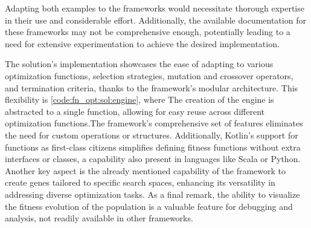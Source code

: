     Adapting both examples to the frameworks would necessitate thorough expertise in their use and considerable 
    effort. Additionally, the available documentation for these frameworks may not be comprehensive enough, 
    potentially leading to a need for extensive experimentation to achieve the desired implementation.

    The solution's implementation showcases the ease of adapting to various optimization functions, selection 
    strategies, mutation and crossover operators, and termination criteria, thanks to the framework's modular 
    architecture. This flexibility is \vref{code:fn_opt:sol:engine}, where The creation of the engine is abstracted to
    a single function, allowing for easy reuse across different optimization functions.The framework's comprehensive 
    set of features eliminates the need for custom operations or structures. Additionally, Kotlin's support for 
    functions as first-class citizens simplifies defining fitness functions without extra interfaces or classes, a 
    capability also present in languages like Scala or Python. Another key aspect is the already mentioned capability of
    the framework to create genes tailored to specific search spaces, enhancing its versatility in addressing diverse
    optimization tasks. As a final remark, the ability to visualize the fitness evolution of the population is a
    valuable feature for debugging and analysis, not readily available in other frameworks.
